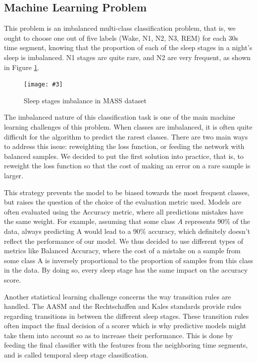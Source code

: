 \documentclass[titlepage, 11pt, a4paper, fancysections]{article}
\newcommand{\fig}[5]{\begin{figure}[#1] \centering \texttt{[image: \#3]} \caption{#4} \label{#5} \end{figure}}
\begin{document}
\subsection{Machine Learning Problem}
This problem is an imbalanced multi-class classification problem, that is, we ought to choose one out of five labels (Wake, N1, N2, N3, REM) for each 30s time segment, knowing that the proportion of each of the sleep stages in a night's sleep is imbalanced. N1 stages are quite rare, and N2 are very frequent, as shown in Figure \ref{fig:class_imbalance}.

\fig{!ht}{0.8\linewidth}{class_imbalance.png}{Sleep stages imbalance in MASS dataset}{fig:class_imbalance}

The imbalanced nature of this classification task is one of the main machine learning challenges of this problem. When classes are imbalanced, it is often quite difficult for the algorithm to predict the rarest classes. There are two main ways to address this issue: reweighting the loss function, or feeding the network with balanced samples. We decided to put the first solution into practice, that is, to reweight the loss function so that the cost of making an error on a rare sample is larger. 

This strategy prevents the model to be biased towards the most frequent classes, but raises the question of the choice of the evaluation metric used. Models are often evaluated using the Accuracy metric, where all predictions mistakes have the same weight. For example, assuming that some class $A$ represents 90\% of the data, always predicting A would lead to a 90\% accuracy, which definitely doesn't reflect the performance of our model. We thus decided to use different types of metrics like Balanced Accuracy, where the cost of a mistake on a sample from some class A is inversely proportional to the proportion of samples from this class in the data. By doing so, every sleep stage has the same impact on the accuracy score. 

Another statistical learning challenge concerns the way transition rules are handled. The AASM and the Rechtschaffen and Kales standards provide rules regarding transitions in between the different sleep stages. These transition rules often impact the final decision of a scorer which is why predictive models might take them into account so as to increase their performance. This is done by feeding the final classifier with the features from the neighboring time segments, and is called temporal sleep stage classification. 
\end{document}
